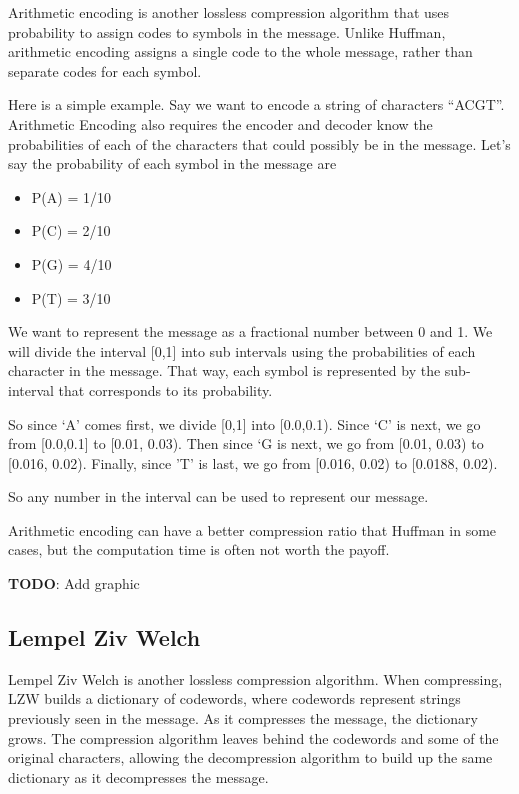 \documentclass[12pt,twoside]{reedthesis}
\providecommand{\tightlist}{%
  \setlength{\itemsep}{0pt}\setlength{\parskip}{0pt}}
\begin{document}
Arithmetic encoding is another lossless compression algorithm that uses probability to assign codes to symbols in the message. Unlike Huffman, arithmetic encoding assigns a single code to the whole message, rather than separate codes for each symbol.

Here is a simple example. Say we want to encode a string of characters ``ACGT''. Arithmetic Encoding also requires the encoder and decoder know the probabilities of each of the characters that could possibly be in the message. Let's say the probability of each symbol in the message are
\begin{itemize}
\tightlist
\item
  P(A) = 1/10
\item
  P(C) = 2/10
\item
  P(G) = 4/10
\item
  P(T) = 3/10
\end{itemize}
We want to represent the message as a fractional number between 0 and 1. We will divide the interval {[}0,1{]} into sub intervals using the probabilities of each character in the message. That way, each symbol is represented by the sub-interval that corresponds to its probability.

So since `A' comes first, we divide {[}0,1{]} into {[}0.0,0.1). Since `C' is next, we go from {[}0.0,0.1{]} to {[}0.01, 0.03). Then since `G is next, we go from {[}0.01, 0.03) to {[}0.016, 0.02). Finally, since 'T' is last, we go from {[}0.016, 0.02) to {[}0.0188, 0.02).

So any number in the interval can be used to represent our message.

Arithmetic encoding can have a better compression ratio that Huffman in some cases, but the computation time is often not worth the payoff.

\textbf{TODO}: Add graphic

\hypertarget{lempel-ziv-welch}{%
\subsection{Lempel Ziv Welch}\label{lempel-ziv-welch}}

Lempel Ziv Welch is another lossless compression algorithm. When compressing, LZW builds a dictionary of codewords, where codewords represent strings previously seen in the message. As it compresses the message, the dictionary grows. The compression algorithm leaves behind the codewords and some of the original characters, allowing the decompression algorithm to build up the same dictionary as it decompresses the message.
\end{document}
